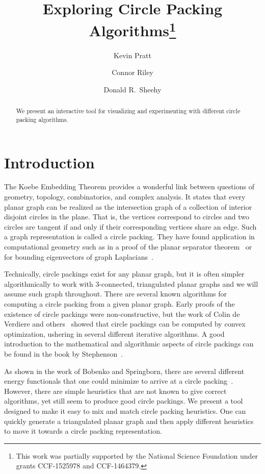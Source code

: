 \documentclass[a4paper,UKenglish]{lipics-v2016}
\title{Exploring Circle Packing Algorithms\footnote{This work was partially supported by the National Science Foundation under grants CCF-1525978 and CCF-1464379.}}
\author[1]{Kevin Pratt}
\author[2]{Connor Riley}
\author[3]{Donald R.~Sheehy}
\affil[1]{University of Connecticut\\
  \texttt{kevin.pratt@uconn.edu}}
\affil[2]{University of Connecticut\\
  \texttt{connor.riley@uconn.edu}}
\affil[3]{University of Connecticut\\
  \texttt{don.r.sheehy@gmail.com}}
\begin{document}
\maketitle

\begin{abstract}
  We present an interactive tool for visualizing and experimenting with different circle packing algorithms.
\end{abstract}

\section{Introduction}
\label{sec:introduction}

  The Koebe Embedding Theorem provides a wonderful link between questions of geometry, topology, combinatorics, and complex analysis.
  It states that every planar graph can be realized as the intersection graph of a collection of interior disjoint circles in the plane.
  That is, the vertices correspond to circles and two circles are tangent if and only if their corresponding vertices share an edge.
  Such a graph representation is called a circle packing.
  They have found application in computational geometry such as in a proof of the planar separator theorem~\cite{miller97separators} or for bounding eigenvectors of graph Laplacians~\cite{kelner06spectral}.
  
  Technically, circle packings exist for any planar graph, but it is often simpler algorithmically to work with $3$-connected, triangulated planar graphs and we will assume such graph throughout.
  There are several known algorithms for computing a circle packing from a given planar graph.
  Early proofs of the existence of circle packings were non-constructive, but the work of Colin de Verdiere\cite{colindeverdiere91principe} and others~\cite{mohar93polynomial,bobenko03variational} showed that circle packings can be computed by convex optimization, ushering in several different iterative algorithms.
  A good introduction to the mathematical and algorithmic aspects of circle packings can be found in the book by Stephenson~\cite{stephenson05introduction}.
  
  As shown in the work of Bobenko and Springborn, there are several different energy functionals that one could minimize to arrive at a circle packing~\cite{bobenko03variational}.
  However, there are simple heuristics that are not known to give correct algorithms, yet still seem to produce good circle packings. 
  We present a tool designed to make it easy to mix and match circle packing heuristics. 
  One can quickly generate a triangulated planar graph and then apply different heuristics to move it towards a circle packing representation.
\end{document}
